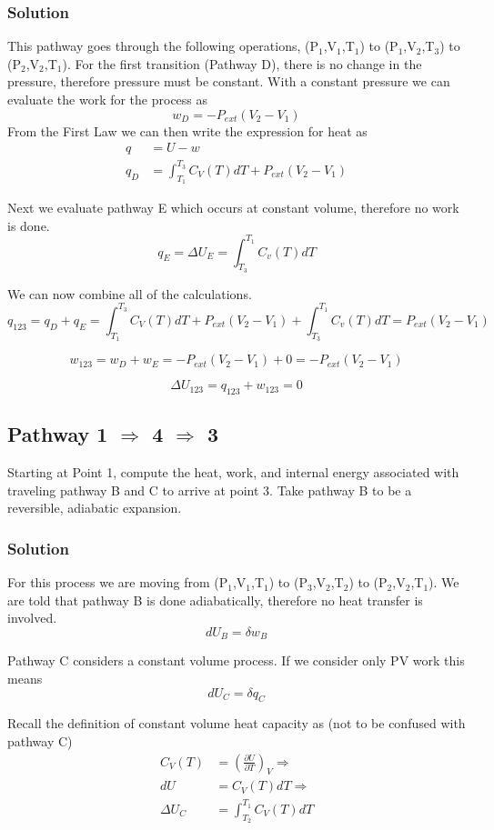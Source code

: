 \documentclass{article}
\newcommand{\be}{\begin{equation}}
\newcommand{\ee}{\end{equation}}
\newcommand{\pd}{\partial}
\begin{document}
 \subsubsection{Solution}
 This pathway goes through the following operations, (P$_1$,V$_1$,T$_1$) to (P$_1$,V$_2$,T$_3$) to (P$_2$,V$_2$,T$_1$). 
 For the first transition (Pathway D), there is no change in the pressure, therefore pressure must be constant. 
 With a constant pressure we can evaluate the work for the process as 
 \be
 w_D = -P_{ext}(V_2 - V_1)
 \ee
 From the First Law we can then write the expression for heat as 
 \be
 \begin{split}
 q &= U - w \\
 q_D &= \int_{T_1}^{T_3} C_V(T)dT + P_{ext}(V_2-V_1)
 \end{split}
 \ee
 
 Next we evaluate pathway E which occurs at constant volume, therefore no work is done. 
 \be
 q_E = \Delta U_E = \int_{T_3}^{T_1} C_v(T) dT
 \ee
 
 We can now combine all of the calculations.
\be
q_{123} = q_D + q_E = \int_{T_1}^{T_3} C_V(T)dT + P_{ext}(V_2-V_1) + \int_{T_3}^{T_1} C_v(T) dT = P_{ext}(V_2-V_1)
\ee

\be
w_{123} = w_D + w_E = -P_{ext}(V_2 - V_1) + 0 = -P_{ext}(V_2 - V_1)
\ee

\be
\Delta U_{123} = q_{123} + w_{123} = 0
\ee
 
 
 \subsection{Pathway 1 $\Rightarrow$ 4 $\Rightarrow$ 3}
Starting at Point 1, compute the heat, work, and internal energy associated with traveling pathway B and C to arrive at point 3.
Take pathway B to be a reversible, adiabatic expansion. 

\subsubsection{Solution}
For this process we are moving from (P$_1$,V$_1$,T$_1$) to (P$_3$,V$_2$,T$_2$) to (P$_2$,V$_2$,T$_1$). 
We are told that pathway B is done adiabatically, therefore no heat transfer is involved.
\be
d U_B = \delta w_B
\ee

Pathway C considers a constant volume process. 
If we consider only PV work this means
\be
d U_C = \delta q_C
\ee

Recall the definition of constant volume heat capacity as (not to be confused with pathway C)
\be
\begin{split}
C_V (T) &= \left(\frac{\pd U}{\pd T}\right)_V \Rightarrow\\
dU &= C_V(T) dT \Rightarrow \\
\Delta U_C &= \int_{T_2}^{T_1} C_V(T) dT
\end{split}
\ee
\end{document}

